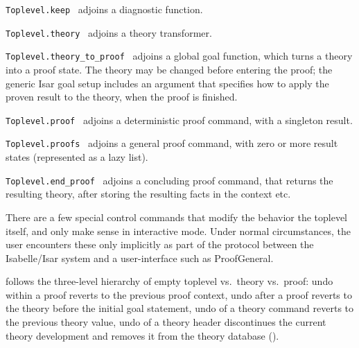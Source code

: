 \begin{isabellebody}
\begin{isamarkuptext}
\begin{description}
  \item \verb|Toplevel.keep|~ adjoins a diagnostic
  function.

  \item \verb|Toplevel.theory|~ adjoins a theory
  transformer.

  \item \verb|Toplevel.theory_to_proof|~ adjoins a global
  goal function, which turns a theory into a proof state.  The theory
  may be changed before entering the proof; the generic Isar goal
  setup includes an argument that specifies how to apply the proven
  result to the theory, when the proof is finished.

  \item \verb|Toplevel.proof|~ adjoins a deterministic
  proof command, with a singleton result.

  \item \verb|Toplevel.proofs|~ adjoins a general proof
  command, with zero or more result states (represented as a lazy
  list).

  \item \verb|Toplevel.end_proof|~ adjoins a concluding
  proof command, that returns the resulting theory, after storing the
  resulting facts in the context etc.

  \end{description}%
\end{isamarkuptext}%
\isamarkuptrue%
%
\endisatagmlref
{\isafoldmlref}%
%
\isadelimmlref
%
\endisadelimmlref
%
\isamarkuptrue%
%
\begin{isamarkuptext}%
There are a few special control commands that modify the behavior
  the toplevel itself, and only make sense in interactive mode.  Under
  normal circumstances, the user encounters these only implicitly as
  part of the protocol between the Isabelle/Isar system and a
  user-interface such as ProofGeneral.

  \begin{description}

  \item {} follows the three-level hierarchy of empty
  toplevel vs.\ theory vs.\ proof: undo within a proof reverts to the
  previous proof context, undo after a proof reverts to the theory
  before the initial goal statement, undo of a theory command reverts
  to the previous theory value, undo of a theory header discontinues
  the current theory development and removes it from the theory
  database ().


\end{description}
\end{isamarkuptext}
\end{isabellebody}
